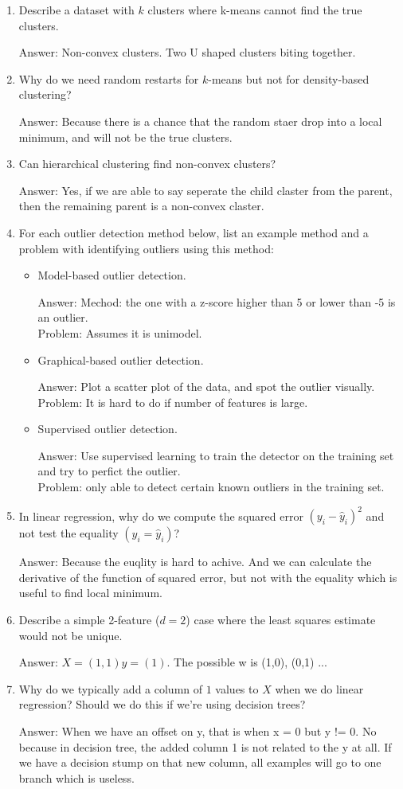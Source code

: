 \documentclass{article}
\def\ans#1{\par\gre{Answer: #1}}
\def\gre#1{{\color{gre}#1}}
\begin{document}
\begin{enumerate}
\item Describe a dataset with $k$ clusters where k-means cannot find the true clusters. \ans{Non-convex clusters. Two U shaped clusters biting together.}
\item Why do we need random restarts for $k$-means but not for density-based clustering? \ans{ Because there is a chance that the random staer drop into a local minimum, and will not be the true clusters.}
\item Can hierarchical clustering find non-convex clusters? \ans{Yes, if we are able to say seperate the child claster from the parent, then the remaining parent is a non-convex claster.}
\item For each outlier detection method below, list an example method and a problem with identifying outliers using this method:
\begin{itemize}
\item Model-based outlier detection. \ans{Mechod: the one with a z-score higher than 5 or lower than -5 is an outlier. \\ Problem: Assumes it is unimodel. }
\item Graphical-based outlier detection. \ans{Plot a scatter plot of the data, and spot the outlier visually.\\ Problem: It is hard to do if number of features is large.}
\item Supervised outlier detection. \ans{Use supervised learning to train the detector on the training set and try to perfict the outlier. \\ Problem: only able to detect certain known outliers in the training set.}
\end{itemize}
\item In linear regression, why do we compute the squared error $(y_i -  \hat{y}_i)^2$ and not test the equality $(y_i = \hat{y}_i)$? \ans{Because the euqlity is hard to achive. And we can calculate the derivative of the function of squared error, but not with the equality which is useful to find local minimum.}
\item Describe a simple 2-feature ($d=2$) case where the least squares estimate would not be unique. \ans{$X =(1, 1) y = (1)$. The possible w is (1,0), (0,1) ... }
\item Why do we typically add a column of $1$ values to $X$ when we do linear regression? Should we do this if we're using decision trees? \ans{When we have an offset on y, that is when x = 0 but y != 0. No because in decision tree, the added column 1 is not related to the y at all. If we have a decision stump on that new column, all examples will go to one branch which is useless.}

\end{enumerate}
\end{document}
